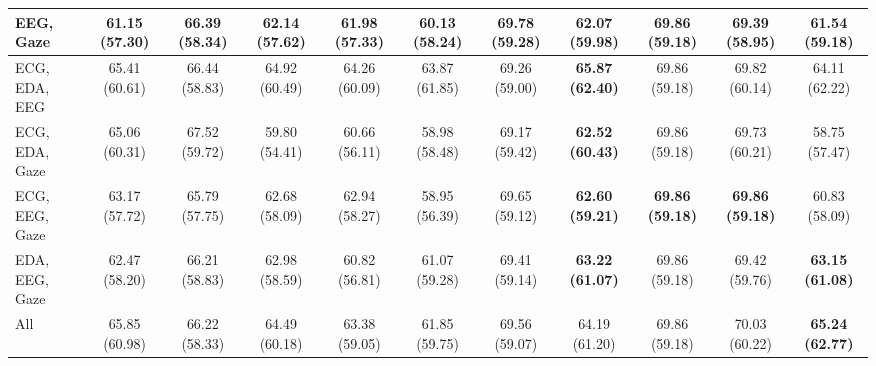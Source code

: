 \begin{table}[!htbp]
\begin{tabular}{lcccccccccc}
    EEG, Gaze & 61.15 (57.30) & 66.39 (58.34) & 62.14 (57.62) & 61.98 (57.33) & 60.13 (58.24) & 69.78 (59.28) & \textbf{62.07 (59.98)} & 69.86 (59.18) & 69.39 (58.95) & 61.54 (59.18) \\
    \midrule
    ECG, EDA, EEG & 65.41 (60.61) & 66.44 (58.83) & 64.92 (60.49) & 64.26 (60.09) & 63.87 (61.85) & 69.26 (59.00) & \textbf{65.87 (62.40)} & 69.86 (59.18) & 69.82 (60.14) & 64.11 (62.22) \\
    ECG, EDA, Gaze & 65.06 (60.31) & 67.52 (59.72) & 59.80 (54.41) & 60.66 (56.11) & 58.98 (58.48) & 69.17 (59.42) & \textbf{62.52 (60.43)} & 69.86 (59.18) & 69.73 (60.21) & 58.75 (57.47) \\
    ECG, EEG, Gaze & 63.17 (57.72) & 65.79 (57.75) & 62.68 (58.09) & 62.94 (58.27) & 58.95 (56.39) & 69.65 (59.12) & \textbf{62.60 (59.21)} & \textbf{69.86 (59.18)} & \textbf{69.86 (59.18)} & 60.83 (58.09) \\
    EDA, EEG, Gaze & 62.47 (58.20) & 66.21 (58.83) & 62.98 (58.59) & 60.82 (56.81) & 61.07 (59.28) & 69.41 (59.14) & \textbf{63.22 (61.07)} & 69.86 (59.18) & 69.42 (59.76) & \textbf{63.15 (61.08)} \\
    \midrule
    All & 65.85 (60.98) & 66.22 (58.33) & 64.49 (60.18) & 63.38 (59.05) & 61.85 (59.75) & 69.56 (59.07) & 64.19 (61.20) & 69.86 (59.18) & 70.03 (60.22) & \textbf{65.24 (62.77)} \\
    \bottomrule
  \end{tabular}
\end{table}
